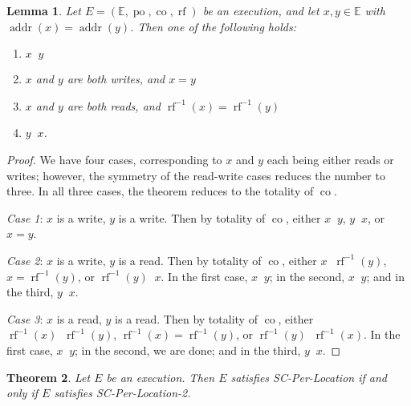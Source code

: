 \documentclass[]{eptcs}
\newtheorem{theorem}{Theorem}[section]
\newtheorem{lemma}[theorem]{Lemma}
\DeclareMathOperator{\addr}{addr}
\DeclareMathOperator{\po}{po}
\DeclareMathOperator{\co}{co}
\DeclareMathOperator{\rf}{rf}
\DeclareMathOperator{\coto}{\xrightarrow{co}}
\DeclareMathOperator{\rfto}{\xrightarrow{rf}}
\DeclareMathOperator{\frto}{\xrightarrow{fr}}
\DeclareMathOperator{\frrfto}{\xrightarrow{fr;rf}}
\DeclareMathOperator{\corfto}{\xrightarrow{co;rf}}
\DeclareMathOperator{\compto}{\xrightarrow{com^+}}
\newcommand{\rfinv}{\rf^{-1}}
\begin{document}
\begin{lemma}\label{comp-total}
Let $E = (\mathbb{E}, \po, \co, \rf)$ be an execution, and let $x, y \in \mathbb{E}$ with $\addr(x) = \addr(y)$. Then one of the following holds:
\begin{enumerate}
  \item $x \compto y$
  \item $x$ and $y$ are both writes, and $x = y$
  \item $x$ and $y$ are both reads, and $\rfinv(x) = \rfinv(y)$
  \item $y \compto x$.
\end{enumerate}
\end{lemma}
\begin{proof}
We have four cases, corresponding to $x$ and $y$ each being either reads or writes; however, the symmetry of the read-write cases reduces the number to three. In all three cases, the theorem reduces to the totality of $\co$.

\emph{Case 1}: $x$ is a write, $y$ is a write. Then by totality of $\co$, either $x \coto y$, $y \coto x$, or $x = y$.

\emph{Case 2}: $x$ is a write, $y$ is a read. Then by totality of $\co$, either $x \coto \rfinv(y)$, $x = \rfinv(y)$, or $\rfinv(y) \coto x$. In the first case, $x \corfto y$; in the second, $x \rfto y$; and in the third, $y \frto x$.

\emph{Case 3}: $x$ is a read, $y$ is a read. Then by totality of $\co$, either $\rfinv(x) \coto \rfinv(y)$, $\rfinv(x) = \rfinv(y)$, or $\rfinv(y) \coto \rfinv(x)$. In the first case, $x \frrfto y$; in the second, we are done; and in the third, $y \frrfto x$.
\end{proof}

\begin{theorem}
Let $E$ be an execution. Then $E$ satisfies SC-Per-Location if and only if $E$ satisfies SC-Per-Location-2.
\end{theorem}
\end{document}
